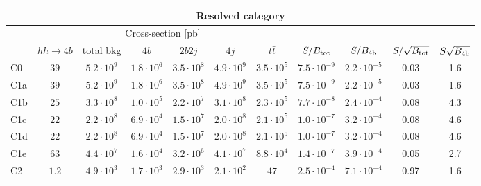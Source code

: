 \begin{tabular}{|l|cc|cccc|cccc|}
  \hline
\multicolumn{11}{|c|}{Resolved category}\\
\hline
&  \multicolumn{6}{c|}{Cross-section [pb]} &  &  & &  \\
   &  $hh\to 4b$ &  total bkg  &   $4b$    &  $2b2j$   &   $4j$    &
$t\bar{t}$ &
$S/B_{\rm tot}$ & $S/B_{\rm 4b}$ & $S/\sqrt{B_{\rm tot}}$ & $S\sqrt{B_{\rm 4b}}$ \\
  \hline
  \hline
 C0    & $39$  &   $5.2\cdot 10^9$   & $1.8\cdot 10^6$ & $3.5\cdot 10^8$ & $4.9\cdot 10^9$ & $3.5\cdot 10^5$  & $7.5\cdot 10^{-9}$   &  $2.2\cdot 10^{-5}$  &   0.03   & 1.6        \\
 C1a   & $39$  &   $5.2\cdot 10^9$   & $1.8\cdot 10^6$ & $3.5\cdot 10^8$ & $4.9\cdot 10^9$ & $3.5\cdot 10^5$ &  $7.5\cdot 10^{-9}$   & $2.2\cdot 10^{-5}$   &     0.03   & 1.6       \\
 C1b   & $25$  &   $3.3\cdot 10^8$   & $1.0\cdot 10^5$ & $2.2\cdot 10^7$ & $3.1\cdot 10^8$ & $2.3\cdot 10^5$ &  $7.7\cdot 10^{-8}$  &  $2.4\cdot 10^{-4}$  &    0.08   & 4.3       \\
 C1c   & $22$  &   $2.2\cdot 10^8$   & $6.9\cdot 10^4$ & $1.5\cdot 10^7$ & $2.0\cdot 10^8$ & $2.1\cdot 10^5$ &  $1.0\cdot 10^{-7}$  &  $3.2\cdot 10^{-4}$  &  0.08   & 4.6         \\
 C1d   & $22$  &   $2.2\cdot 10^8$   & $6.9\cdot 10^4$ & $1.5\cdot 10^7$ & $2.0\cdot 10^8$ & $2.1\cdot 10^5$ &  $1.0\cdot 10^{-7}$  & $3.2\cdot 10^{-4}$   &  0.08   & 4.6         \\
 C1e   & $63$  &   $4.4\cdot 10^7$   & $1.6\cdot 10^4$ & $3.2\cdot 10^6$ & $4.1\cdot 10^7$ & $8.8\cdot 10^4$ &   $1.4\cdot 10^{-7}$  &  $3.9\cdot 10^{-4}$   &   0.05   & 2.7         \\
 C2    & $1.2$  &   $4.9\cdot 10^3$   & $1.7\cdot 10^3$ & $2.9\cdot 10^3$ & $2.1\cdot 10^2$ & $47$ &            $ 2.5\cdot 10^{-4}$   & $7.1\cdot 10^{-4}$   &   0.97   & 1.6       \\
\hline
\end{tabular}
